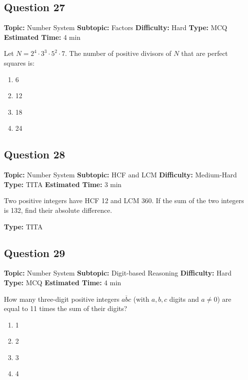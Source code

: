 \documentclass[11pt]{article}
\begin{document}
\subsection*{Question 27}
\textbf{Topic:} Number System \quad \textbf{Subtopic:} Factors \quad \textbf{Difficulty:} Hard \quad \textbf{Type:} MCQ \quad \textbf{Estimated Time:} 4 min

\begin{tcolorbox}
Let $N = 2^{4} \cdot 3^{3} \cdot 5^{2} \cdot 7$. The number of positive divisors of $N$ that are perfect squares is:
\end{tcolorbox}
\begin{enumerate}[label=(\Alph*)]
\item 6
\item 12
\item 18
\item 24
\end{enumerate}

\subsection*{Question 28}
\textbf{Topic:} Number System \quad \textbf{Subtopic:} HCF and LCM \quad \textbf{Difficulty:} Medium-Hard \quad \textbf{Type:} TITA \quad \textbf{Estimated Time:} 3 min

\begin{tcolorbox}
Two positive integers have HCF 12 and LCM 360. If the sum of the two integers is 132, find their absolute difference.
\end{tcolorbox}
\textbf{Type:} TITA

\subsection*{Question 29}
\textbf{Topic:} Number System \quad \textbf{Subtopic:} Digit-based Reasoning \quad \textbf{Difficulty:} Hard \quad \textbf{Type:} MCQ \quad \textbf{Estimated Time:} 4 min

\begin{tcolorbox}
How many three-digit positive integers $\overline{abc}$ (with $a, b, c$ digits and $a \ne 0$) are equal to 11 times the sum of their digits?
\end{tcolorbox}
\begin{enumerate}[label=(\Alph*)]
\item 1
\item 2
\item 3
\item 4
\end{enumerate}
\end{document}
